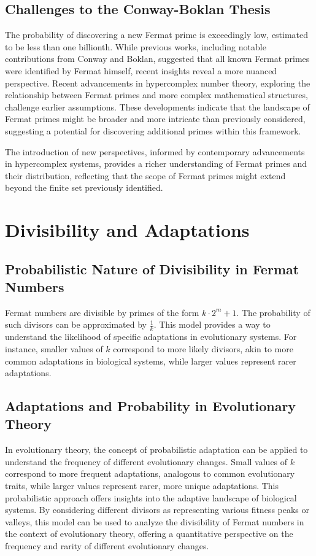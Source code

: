 \documentclass[12pt]{article}
\begin{document}
\subsection{Challenges to the Conway-Boklan Thesis}

The probability of discovering a new Fermat prime is exceedingly low, estimated to be less than one billionth. While previous works, including notable contributions from Conway and Boklan, suggested that all known Fermat primes were identified by Fermat himself, recent insights reveal a more nuanced perspective. Recent advancements in hypercomplex number theory, exploring the relationship between Fermat primes and more complex mathematical structures, challenge earlier assumptions. These developments indicate that the landscape of Fermat primes might be broader and more intricate than previously considered, suggesting a potential for discovering additional primes within this framework.

The introduction of new perspectives, informed by contemporary advancements in hypercomplex systems, provides a richer understanding of Fermat primes and their distribution, reflecting that the scope of Fermat primes might extend beyond the finite set previously identified.

\section{Divisibility and Adaptations}

\subsection{Probabilistic Nature of Divisibility in Fermat Numbers}

Fermat numbers are divisible by primes of the form \( k \cdot 2^m + 1 \). The probability of such divisors can be approximated by \( \frac{1}{k} \). This model provides a way to understand the likelihood of specific adaptations in evolutionary systems. For instance, smaller values of \( k \) correspond to more likely divisors, akin to more common adaptations in biological systems, while larger values represent rarer adaptations.

\subsection{Adaptations and Probability in Evolutionary Theory}

In evolutionary theory, the concept of probabilistic adaptation can be applied to understand the frequency of different evolutionary changes. Small values of \( k \) correspond to more frequent adaptations, analogous to common evolutionary traits, while larger values represent rarer, more unique adaptations. This probabilistic approach offers insights into the adaptive landscape of biological systems. By considering different divisors as representing various fitness peaks or valleys, this model can be used to analyze the divisibility of Fermat numbers in the context of evolutionary theory, offering a quantitative perspective on the frequency and rarity of different evolutionary changes.
\end{document}
